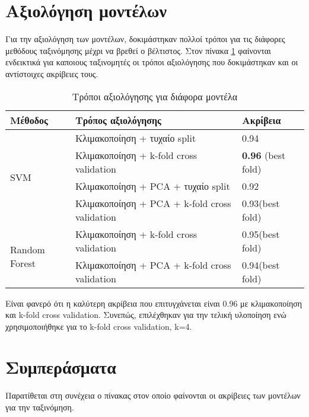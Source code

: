 \section{Αξιολόγηση μοντέλων}

Για την αξιολόγηση των μοντέλων, δοκιμάστηκαν πολλοί τρόποι για τις διάφορες μεθόδους ταξινόμησης μέχρι να βρεθεί ο βέλτιστος. Στον πίνακα \ref{table:tab1} φαίνονται ενδεικτικά για καποιους ταξινομητές οι τρόποι αξιολόγησης που δοκιμάστηκαν και οι αντίστοιχες ακρίβειες τους.


\begin{table}[H]
\begin{tabular}{|l|l|l|}
\hline
\textbf{Μέθοδος}               & \textbf{Τρόπος αξιολόγησης}                   & \textbf{Ακρίβεια}         \\ \hline
\multirow{4}{*}{SVM}           & Κλιμακοποίηση + τυχαίο split                  & 0.94                      \\ \cline{2-3} 
                               & Κλιμακοποίηση + k-fold cross validation       & \textbf{0.96} (best fold) \\ \cline{2-3} 
                               & Κλιμακοποίηση + PCA + τυχαίο split            & 0.92                      \\ \cline{2-3} 
                               & Κλιμακοποίηση + PCA + k-fold cross validation & 0.93(best fold)           \\ \hline
\multirow{2}{*}{Random Forest} & Κλιμακοποίηση + k-fold cross validation       & 0.95(best fold)   		   \\ \cline{2-3} 
                               & Κλιμακοποίηση + PCA + k-fold cross validation & 0.94(best fold)           \\ \hline
\end{tabular}
\caption{Τρόποι αξιολόγησης για διάφορα μοντέλα}
\label{table:tab1}
\end{table}

Είναι φανερό ότι η καλύτερη ακρίβεια που επιτυγχάνεται είναι 0.96 με κλιμακοποίηση και k-fold cross validation. Συνεπώς, επιλέχθηκαν για την τελική υλοποίηση ενώ χρησιμοποιήθηκε για το k-fold cross validation, k=4.

\section{Συμπεράσματα}

Παρατίθεται στη συνέχεια ο πίνακας στον οποίο φαίνονται οι ακρίβειες των μοντέλων για την ταξινόμηση.

